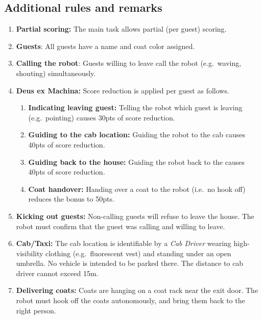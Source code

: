 \subsection*{Additional rules and remarks}
\begin{enumerate}[nosep]
	\item \textbf{Partial scoring:} The main task allows partial (per guest) scoring.

	\item \textbf{Guests}: All guests have a name and coat color assigned.

	\item \textbf{Calling the robot}: Guests willing to leave call the robot (e.g.~waving, shouting) simultaneously.

	\item \textbf{Deus ex Machina:} Score reduction is applied per guest as follows.
	\begin{enumerate}[nosep]
		\item \textbf{Indicating leaving guest:} Telling the robot which guest is leaving (e.g.~pointing) causes 30pts of score reduction.

		\item \textbf{Guiding to the cab location:} Guiding the robot to the cab causes 40pts of score reduction.

		\item \textbf{Guiding back to the house:} Guiding the robot back to the \Arena{} causes 40pts of score reduction.

		\item \textbf{Coat handover:} Handing over a coat to the robot (i.e.~no hook off) reduces the bonus to 50pts.
	\end{enumerate}

	\item \textbf{Kicking out guests:} Non-calling guests will refuse to leave the house. The robot must confirm that the guest was calling and willing to leave.

	\item \textbf{Cab/Taxi:} The cab location is identifiable by a \emph{Cab Driver} wearing high-visibility clothing (e.g.~fluorescent vest) and standing under an open umbrella.
	No vehicle is intended to be parked there.
	The distance to cab driver cannot exceed 15m.

	\item \textbf{Delivering coats:} Coats are hanging on a coat rack near the exit door.
	The robot must hook off the coats autonomously, and bring them back to the right person.
\end{enumerate}


